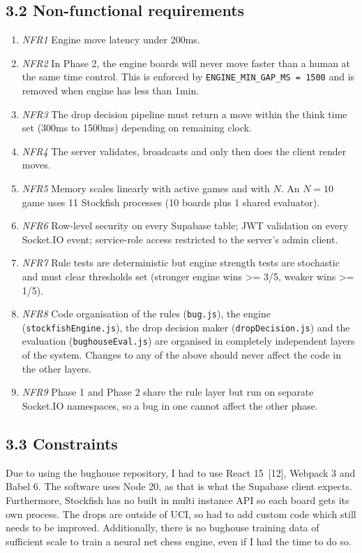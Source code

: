 \documentclass[11pt,a4paper]{article}
\begin{document}
\subsection*{3.2 Non-functional requirements}

\begin{enumerate}[leftmargin=*]
\item \textit{NFR1} Engine move latency under 200ms.
\item \textit{NFR2} In Phase 2, the engine boards will never move faster than a human at the same time control. This is enforced by \texttt{ENGINE\_MIN\_GAP\_MS = 1500} and is removed when engine has less than 1min.
\item \textit{NFR3} The drop decision pipeline must return a move within the think time set (300ms to 1500ms) depending on remaining clock.
\item \textit{NFR4} The server validates, broadcasts and only then does the client render moves.
\item \textit{NFR5} Memory scales linearly with active games and with $N$. An $N{=}10$ game uses 11 Stockfish processes (10 boards plus 1 shared evaluator).
\item  \textit{NFR6} Row-level security on every Supabase table; JWT validation on every Socket.IO event; service-role access restricted to the server's admin client.
\item \textit{NFR7} Rule tests are deterministic but engine strength tests are stochastic and must clear thresholds set (stronger engine wins >= 3/5, weaker wins >= 1/5).
\item \textit{NFR8} Code organisation of the rules (\texttt{bug.js}), the engine (\texttt{stockfishEngine.js}), the drop decision maker (\texttt{dropDecision.js}) and the evaluation (\texttt{bughouseEval.js}) are organised in completely independent layers of the system. Changes to any of the above should never affect the code in the other layers.
\item \textit{NFR9} Phase 1 and Phase 2 share the rule layer but run on separate Socket.IO namespaces, so a bug in one cannot affect the other phase.

\end{enumerate}
\subsection*{3.3 Constraints}
Due to using the bughouse repository, I had to use React 15~[12], Webpack 3 and Babel 6. The software uses Node 20, as that is what the Supabase client expects. Furthermore, Stockfish has no built in multi instance API so each board gets its own process. The drops are outside of UCI, so had to add custom code which still needs to be improved. Additionally, there is no bughouse training data of sufficient scale to train a neural net chess engine, even if I had the time to do so.
\end{document}
